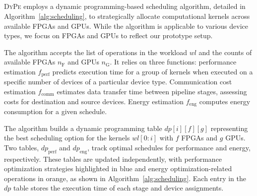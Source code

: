 \subsection{}

\textsc{DyPe} employs a dynamic programming-based scheduling algorithm, detailed in Algorithm~\ref{alg:scheduling}, to strategically allocate computational kernels across available FPGAs and GPUs. While the algorithm is applicable to various device types, we focus on FPGAs and GPUs to reflect our prototype setup.


The algorithm accepts the list of operations in the workload $wl$ and the counts of available FPGAs $n_{\text{F}}$ and GPUs $n_{\text{G}}$. It relies on three functions: performance estimation $f_{\text{perf}}$ predicts execution time for a group of kernels when executed on a specific number of devices of a particular device type. Communication cost estimation $f_{\text{comm}}$ estimates data transfer time between pipeline stages, assessing costs for destination and source devices. Energy estimation $f_{\text{eng}}$ computes energy consumption for a given schedule.


The algorithm builds a dynamic programming table $dp[i][f][g]$ representing the best scheduling option for the kernels $wl[0:i]$ with $f$ FPGAs and $g$ GPUs. Two tables, $dp_{\text{perf}}$ and $dp_{\text{eng}}$, track optimal schedules for performance and energy, respectively. These tables are updated independently, with performance optimization strategies highlighted in blue and energy optimization-related operations in orange, as shown in Algorithm~\ref{alg:scheduling}. Each entry in the $dp$ table stores the execution time of each stage and device assignments.



